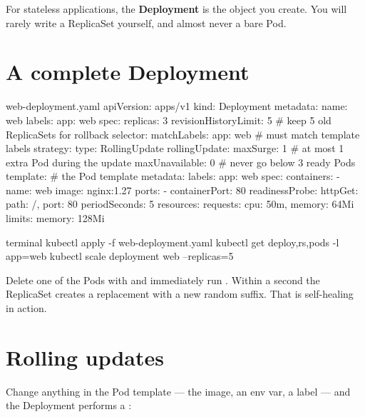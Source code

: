 \begin{keyidea}
For stateless applications, the \textbf{Deployment} is the object you create.
You will rarely write a ReplicaSet yourself, and almost never a bare Pod.
\end{keyidea}

\section{A complete Deployment}

\begin{yamlcode}{web-deployment.yaml}
apiVersion: apps/v1
kind: Deployment
metadata:
  name: web
  labels:
    app: web
spec:
  replicas: 3
  revisionHistoryLimit: 5          # keep 5 old ReplicaSets for rollback
  selector:
    matchLabels:
      app: web                     # must match template labels
  strategy:
    type: RollingUpdate
    rollingUpdate:
      maxSurge: 1                  # at most 1 extra Pod during the update
      maxUnavailable: 0            # never go below 3 ready Pods
  template:                        # the Pod template
    metadata:
      labels:
        app: web
    spec:
      containers:
        - name: web
          image: nginx:1.27
          ports:
            - containerPort: 80
          readinessProbe:
            httpGet: { path: /, port: 80 }
            periodSeconds: 5
          resources:
            requests: { cpu: 50m, memory: 64Mi }
            limits:   { memory: 128Mi }
\end{yamlcode}

\begin{bashcode}{terminal}
kubectl apply -f web-deployment.yaml
kubectl get deploy,rs,pods -l app=web
kubectl scale deployment web --replicas=5
\end{bashcode}

\begin{tryit}
Delete one of the Pods with  and immediately run
. Within a second the ReplicaSet creates a replacement
with a new random suffix. That is self-healing in action.
\end{tryit}

\section{Rolling updates}

Change anything in the Pod template --- the image, an env var, a label --- and
the Deployment performs a :


